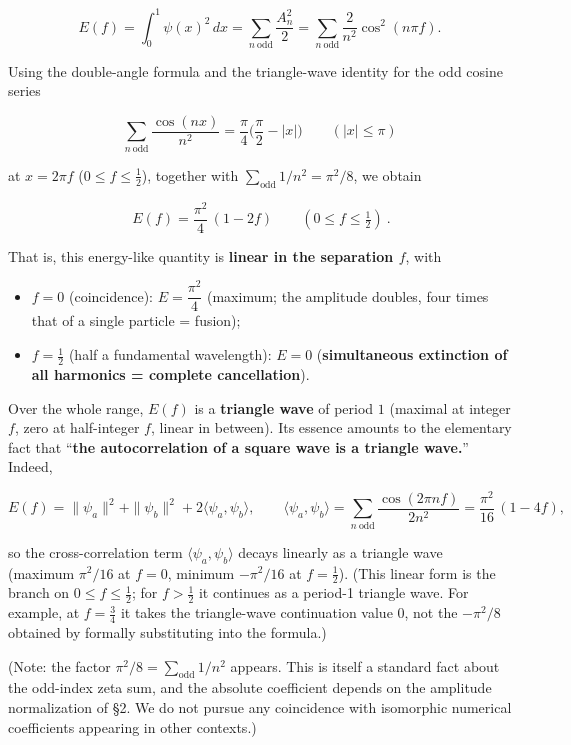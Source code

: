 \documentclass[
]{article}
\providecommand{\tightlist}{%
  \setlength{\itemsep}{0pt}\setlength{\parskip}{0pt}}
\begin{document}
\[E(f)=\int_0^1\psi(x)^2\,dx=\sum_{n\ \mathrm{odd}}\frac{A_n^2}{2}=\sum_{n\ \mathrm{odd}}\frac{2}{n^2}\cos^2(n\pi f).\]

Using the double-angle formula and the triangle-wave identity for the
odd cosine series

\[\sum_{n\ \mathrm{odd}}\frac{\cos(nx)}{n^2}=\frac{\pi}{4}\Big(\frac{\pi}{2}-|x|\Big)\qquad(|x|\le\pi)\]

at \(x=2\pi f\) (\(0\le f\le\tfrac12\)), together with
\(\sum_{\mathrm{odd}}1/n^2=\pi^2/8\), we obtain

\[\boxed{\ E(f)=\frac{\pi^2}{4}\,(1-2f)\qquad(0\le f\le\tfrac12)\ }.\]

That is, this energy-like quantity is \textbf{linear in the separation
\(f\)}, with

\begin{itemize}
\tightlist
\item
  \(f=0\) (coincidence): \(E=\dfrac{\pi^2}{4}\) (maximum; the amplitude
  doubles, four times that of a single particle = fusion);
\item
  \(f=\tfrac12\) (half a fundamental wavelength): \(E=0\)
  (\textbf{simultaneous extinction of all harmonics = complete
  cancellation}).
\end{itemize}

Over the whole range, \(E(f)\) is a \textbf{triangle wave} of period
\(1\) (maximal at integer \(f\), zero at half-integer \(f\), linear in
between). Its essence amounts to the elementary fact that ``\textbf{the
autocorrelation of a square wave is a triangle wave.}'' Indeed,

\[E(f)=\|\psi_a\|^2+\|\psi_b\|^2+2\langle\psi_a,\psi_b\rangle,\qquad \langle\psi_a,\psi_b\rangle=\sum_{n\ \mathrm{odd}}\frac{\cos(2\pi n f)}{2n^2}=\frac{\pi^2}{16}\,(1-4f),\]

so the cross-correlation term \(\langle\psi_a,\psi_b\rangle\) decays
linearly as a triangle wave (maximum \(\pi^2/16\) at \(f=0\), minimum
\(-\pi^2/16\) at \(f=\tfrac12\)). (This linear form is the branch on
\(0\le f\le\tfrac12\); for \(f>\tfrac12\) it continues as a period-1
triangle wave. For example, at \(f=\tfrac34\) it takes the triangle-wave
continuation value \(0\), not the \(-\pi^2/8\) obtained by formally
substituting into the formula.)

(Note: the factor \(\pi^2/8=\sum_{\mathrm{odd}}1/n^2\) appears. This is
itself a standard fact about the odd-index zeta sum, and the absolute
coefficient depends on the amplitude normalization of §2. We do not
pursue any coincidence with isomorphic numerical coefficients appearing
in other contexts.)
\end{document}
